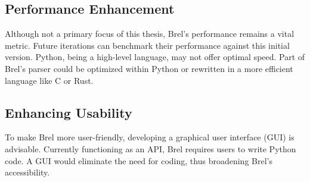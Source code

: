 
\subsection{Performance Enhancement}

Although not a primary focus of this thesis, Brel's performance remains a vital metric.
Future iterations can benchmark their performance against this initial version.
Python, being a high-level language, may not offer optimal speed.
Part of Brel's parser could be 
\textcolor{airforceblue}{optimized within Python or rewritten in a more efficient language} like C or Rust.



\subsection{Enhancing Usability}

To make Brel more user-friendly, 
\textcolor{turkishrose}{developing a graphical user interface} (GUI) is advisable.
Currently functioning as an API, Brel requires users to write Python code.
A GUI would eliminate the need for coding, thus broadening Brel's accessibility.


